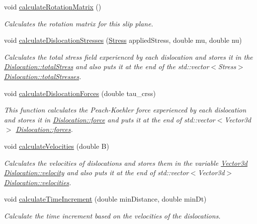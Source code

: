 \begin{DoxyCompactItemize}
void \hyperlink{classSlipPlane_a5d9054f21be225f50860ad1351e3a86f}{calculate\-Rotation\-Matrix} ()
\begin{DoxyCompactList}\small\item\em Calculates the rotation matrix for this slip plane. \end{DoxyCompactList}\item 
void \hyperlink{classSlipPlane_a2d4d2d031502d4a6f0aebbad0990b882}{calculate\-Dislocation\-Stresses} (\hyperlink{classStress}{Stress} applied\-Stress, double mu, double nu)
\begin{DoxyCompactList}\small\item\em Calculates the total stress field experienced by each dislocation and stores it in the \hyperlink{classDislocation_ae27176c0d47fec3e188d7caa4c52f366}{Dislocation\-::total\-Stress} and also puts it at the end of the std\-::vector$<$\-Stress$>$ \hyperlink{classDislocation_adb36ed6c1772f2614ffbed4dcc748c13}{Dislocation\-::total\-Stresses}. \end{DoxyCompactList}\item 
void \hyperlink{classSlipPlane_ac16d1abbbc3b938b6f1f29a33a70212d}{calculate\-Dislocation\-Forces} (double tau\-\_\-crss)
\begin{DoxyCompactList}\small\item\em This function calculates the Peach-\/\-Koehler force experienced by each dislocation and stores it in \hyperlink{classDislocation_a9c19c7493d896bd845c489e1ec3cbbb6}{Dislocation\-::force} and puts it at the end of std\-::vector$<$\-Vector3d$>$ \hyperlink{classDislocation_aa8f4567bbfc6a58aaad01d5c423658c1}{Dislocation\-::forces}. \end{DoxyCompactList}\item 
void \hyperlink{classSlipPlane_aff7af69ba5235da6c8b142193509683c}{calculate\-Velocities} (double B)
\begin{DoxyCompactList}\small\item\em Calculates the velocities of dislocations and stores them in the variable \hyperlink{classVector3d}{Vector3d} \hyperlink{classDislocation_ad6f4e8e94b2525c2e58a77b9d2916c0e}{Dislocation\-::velocity} and also puts it at the end of std\-::vector$<$\-Vector3d$>$ \hyperlink{classDislocation_a9ccdef63384a8b965e70f13920a852f8}{Dislocation\-::velocities}. \end{DoxyCompactList}\item 
void \hyperlink{classSlipPlane_a5418245f8c716d4a35405d68db53bc66}{calculate\-Time\-Increment} (double min\-Distance, double min\-Dt)
\begin{DoxyCompactList}\small\item\em Calculate the time increment based on the velocities of the dislocations. \end{DoxyCompactList}\item 

\end{DoxyCompactItemize}
